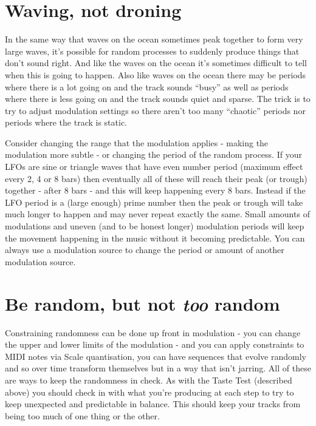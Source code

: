 \documentclass[
  12pt,
  letterpaper,
  oneside,
  open=any]{scrbook}
\begin{document}
\section{Waving, not droning}\label{waving-not-droning}

In the same way that waves on the ocean sometimes peak together to form
very large waves, it's possible for random processes to suddenly produce
things that don't sound right. And like the waves on the ocean it's
sometimes difficult to tell when this is going to happen. Also like
waves on the ocean there may be periods where there is a lot going on
and the track sounds ``busy'' as well as periods where there is less
going on and the track sounds quiet and sparse. The trick is to try to
adjust modulation settings so there aren't too many ``chaotic'' periods
nor periods where the track is static.

Consider changing the range that the modulation applies - making the
modulation more subtle - or changing the period of the random process.
If your LFOs are sine or triangle waves that have even number period
(maximum effect every 2, 4 or 8 bars) then eventually all of these will
reach their peak (or trough) together - after 8 bars - and this will
keep happening every 8 bars. Instead if the LFO period is a (large
enough) prime number then the peak or trough will take much longer to
happen and may never repeat exactly the same. Small amounts of
modulations and uneven (and to be honest longer) modulation periods will
keep the movement happening in the music without it becoming
predictable. You can always use a modulation source to change the period
or amount of another modulation source.

\section{\texorpdfstring{Be random, but not \textbf{\emph{too}}
random}{Be random, but not too random}}\label{be-random-but-not-too-random}

Constraining randomness can be done up front in modulation - you can
change the upper and lower limits of the modulation - and you can apply
constraints to MIDI notes via Scale quantisation, you can have sequences
that evolve randomly and so over time transform themselves but in a way
that isn't jarring. All of these are ways to keep the randomness in
check. As with the Taste Test (described above) you should check in with
what you're producing at each step to try to keep unexpected and
predictable in balance. This should keep your tracks from being too much
of one thing or the other.
\end{document}
